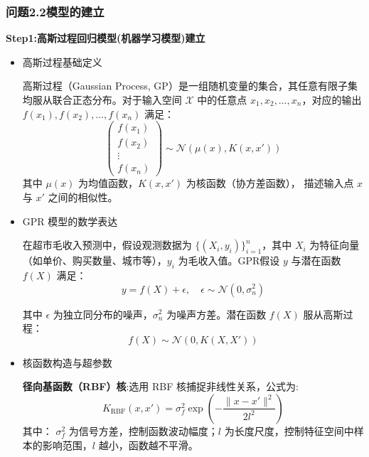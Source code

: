 \documentclass[withoutpreface,bwprint]{cumcmthesis}
\begin{document}
\subsubsection{问题2.2模型的建立}
\textbf{Step1:高斯过程回归模型(机器学习模型)建立}
\par
\begin{itemize}
    \item  高斯过程基础定义 \par
     高斯过程（Gaussian Process, GP）是一组随机变量的集合，其任意有限子集均服从联合正态分布。对于输入空间 \( \mathcal{X} \) 中的任意点 \( x_1, x_2, \dots, x_n \)，对应的输出 \( f(x_1), f(x_2), \dots, f(x_n) \) 满足：
    \begin{equation}
        \begin{pmatrix}
            f(x_1) \\
            f(x_2) \\
            \vdots \\
            f(x_n)
        \end{pmatrix} \sim \mathcal{N}\left( \mu(x), K(x,x') \right)
    \end{equation}
      其中 \( \mu(x) \) 为均值函数，\( K(x,x') \) 为核函数（协方差函数），
    描述输入点 \( x \) 与 \( x' \) 之间的相似性。
    \par

    \item GPR 模型的数学表达\par
    在超市毛收入预测中，假设观测数据为 \( \{(X_i, y_i)\}_{i=1}^n \)，其中 \( X_i \) 为特征向量（如单价、购买数量、城市等），\( y_i \) 为毛收入值。GPR假设 \( y \) 与潜在函数 \( f(X) \) 满足： 
    \begin{equation}    
     y = f(X) + \epsilon, \quad \epsilon \sim \mathcal{N}(0, \sigma_n^2) 
    \end{equation}
    \par 其中 \( \epsilon \) 为独立同分布的噪声，\( \sigma_n^2 \) 为噪声方差。潜在函数 \( f(X) \) 服从高斯过程：
    \begin{equation}
    f(X) \sim \mathcal{N}(0, K(X,X'))   
    \end{equation}
    \item 核函数构造与超参数
    \par
    \textbf{径向基函数（RBF）核}:选用 RBF 核捕捉非线性关系，公式为:
    \begin{equation}
         K_{\text{RBF}}(x, x') = \sigma_f^2 \exp\left(-\frac{\|x - x'\|^2}{2l^2}\right)
    \end{equation}
    其中： \( \sigma_f^2 \) 为信号方差，控制函数波动幅度；\( l \) 为长度尺度，控制特征空间中样本的影响范围，\( l \) 越小，函数越不平滑。
    

\end{itemize}
\end{document}
